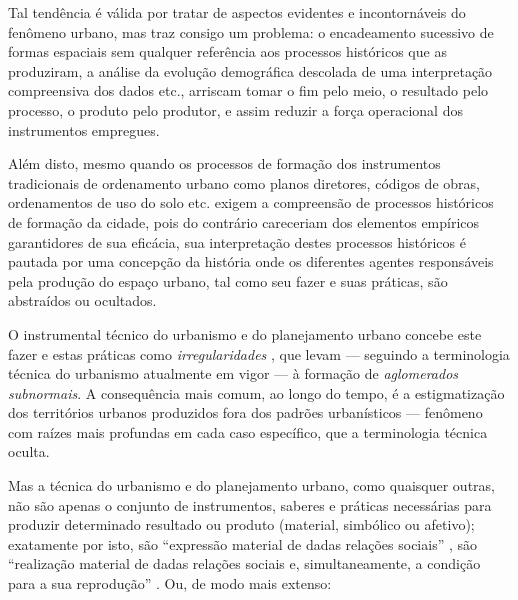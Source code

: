 Tal tendência é válida por tratar de aspectos evidentes e incontornáveis do fenômeno urbano, mas traz consigo um problema: o encadeamento sucessivo de formas espaciais sem qualquer referência aos processos históricos que as produziram, a análise da evolução demográfica descolada de uma interpretação compreensiva dos dados etc., arriscam tomar o fim pelo meio, o resultado pelo processo, o produto pelo produtor, e assim reduzir a força operacional dos instrumentos empregues.

Além disto, mesmo quando os processos de formação dos instrumentos tradicionais de ordenamento urbano como planos diretores, códigos de obras, ordenamentos de uso do solo etc. exigem a compreensão de processos históricos de formação da cidade, pois do contrário careceriam dos elementos empíricos garantidores de sua eficácia, sua interpretação destes processos históricos é pautada por uma concepção da história onde os diferentes agentes responsáveis pela produção do espaço urbano, tal como seu fazer e suas práticas, são abstraídos ou ocultados. 

O instrumental técnico do urbanismo e do planejamento urbano concebe este fazer e estas práticas como \textit{irregularidades} \cite[p.~181-210]{ROLNIK2007}, que levam --- seguindo a terminologia técnica do urbanismo atualmente em vigor --- à formação de \textit{aglomerados subnormais}. A consequência mais comum, ao longo do tempo, é a estigmatização dos territórios urbanos produzidos fora dos padrões urbanísticos --- fenômeno com raízes mais profundas em cada caso específico, que a terminologia técnica oculta.

Mas a técnica do urbanismo e do planejamento urbano, como quaisquer outras, não são apenas o conjunto de instrumentos, saberes e práticas necessárias para produzir determinado resultado ou produto (material, simbólico ou afetivo); exatamente por isto, são ``expressão material de dadas relações sociais'' \cite[p.~266]{BERNARDO1977c}, são ``realização material de dadas relações sociais e, simultaneamente, a condição para a sua reprodução'' \cite[p.~285]{BERNARDO1977c}. Ou, de modo mais extenso:

